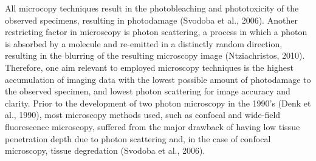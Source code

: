 \documentclass[11pt]{article}
\begin{document}
All microcopy techniques result in the photobleaching and phototoxicity of the observed specimens, resulting in photodamage (Svodoba et al., 2006). Another restricting factor in microscopy is photon scattering, a process in which a photon is absorbed by a molecule and re-emitted in a distinctly random direction, resulting in the blurring of the resulting microscopy image (Ntziachristos, 2010). Therefore, one aim relevant to employed microscopy techniques is the highest accumulation of imaging data with the lowest possible amount of photodamage to the observed specimen, and lowest photon scattering for image accuracy and clarity. Prior to the development of two photon microscopy in the 1990's (Denk et al., 1990), most microscopy methods used, such as confocal and wide-field fluorescence microscopy, suffered from the major drawback of having low tissue penetration depth due to photon scattering and, in the case of confocal microscopy, tissue degredation (Svodoba et al., 2006).\par
\end{document}
